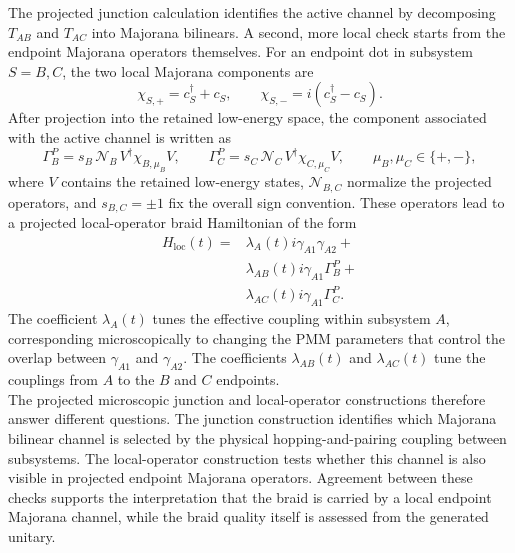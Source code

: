 The projected junction calculation identifies the active channel by decomposing $T_{AB}$ and $T_{AC}$ into Majorana bilinears. A second, more local check starts from the endpoint Majorana operators themselves. For an endpoint dot in subsystem $S=B,C$, the two local Majorana components are
\begin{equation}
  \chi_{S,+}=c_S^\dagger+c_S,
  \qquad
  \chi_{S,-}=i(c_S^\dagger-c_S).
\end{equation}
After projection into the retained low-energy space, the component associated with the active channel is written as
\begin{equation}
  \Gamma_{B}^{P} = s_B\,\mathcal{N}_B\,V^\dagger \chi_{B,\mu_B}V,
  \qquad
  \Gamma_{C}^{P} = s_C\,\mathcal{N}_C\,V^\dagger \chi_{C,\mu_C}V,
  \qquad
  \mu_B,\mu_C\in\{+,-\},
  \label{eq:local_gamma_ops}
\end{equation}
where $V$ contains the retained low-energy states, $\mathcal{N}_{B,C}$ normalize the projected operators, and $s_{B,C}=\pm1$ fix the overall sign convention. These operators lead to a projected local-operator braid Hamiltonian of the form
\begin{equation}
   \begin{aligned}
    H_{\mathrm{loc}}(t) = &\lambda_A(t) i\gamma_{A1}\gamma_{A2} + \\
    &\lambda_{AB}(t) i\gamma_{A1} \Gamma_{B}^{P} + \\
    &\lambda_{AC}(t) i\gamma_{A1} \Gamma_{C}^{P}.
  \end{aligned}
\label{eq:local_braid_ham}
\end{equation}
The coefficient $\lambda_A(t)$ tunes the effective coupling within subsystem $A$, corresponding microscopically to changing the PMM parameters that control the overlap between $\gamma_{A1}$ and $\gamma_{A2}$. The coefficients $\lambda_{AB}(t)$ and $\lambda_{AC}(t)$ tune the couplings from $A$ to the $B$ and $C$ endpoints.\\

The projected microscopic junction and local-operator constructions therefore answer different questions. The junction construction identifies which Majorana bilinear channel is selected by the physical hopping-and-pairing coupling between subsystems. The local-operator construction tests whether this channel is also visible in projected endpoint Majorana operators. Agreement between these checks supports the interpretation that the braid is carried by a local endpoint Majorana channel, while the braid quality itself is assessed from the generated unitary.
